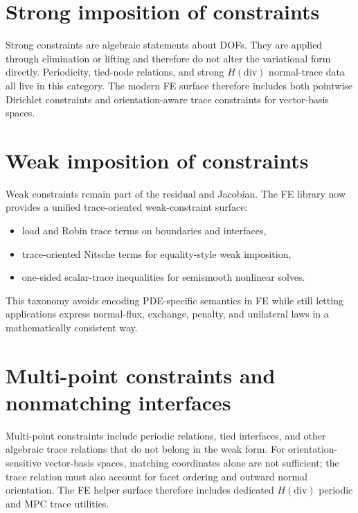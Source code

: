 \section{Strong imposition of constraints}
\label{sec:assembly:strong_constraints}

Strong constraints are algebraic statements about DOFs. They are applied
through elimination or lifting and therefore do not alter the variational form
directly. Periodicity, tied-node relations, and strong $H(\mathrm{div})$
normal-trace data all live in this category. The modern FE surface therefore
includes both pointwise Dirichlet constraints and orientation-aware trace
constraints for vector-basis spaces.

\section{Weak imposition of constraints}
\label{sec:assembly:weak_constraints}

Weak constraints remain part of the residual and Jacobian. The FE library now
provides a unified trace-oriented weak-constraint surface:

\begin{itemize}
\item load and Robin trace terms on boundaries and interfaces,
\item trace-oriented Nitsche terms for equality-style weak imposition,
\item one-sided scalar-trace inequalities for semismooth nonlinear solves.
\end{itemize}

This taxonomy avoids encoding PDE-specific semantics in FE while still letting
applications express normal-flux, exchange, penalty, and unilateral laws in a
mathematically consistent way.

\section{Multi-point constraints and nonmatching interfaces}
\label{sec:assembly:mpc}

Multi-point constraints include periodic relations, tied interfaces, and other
algebraic trace relations that do not belong in the weak form. For
orientation-sensitive vector-basis spaces, matching coordinates alone are not
sufficient; the trace relation must also account for facet ordering and outward
normal orientation. The FE helper surface therefore includes dedicated
$H(\mathrm{div})$ periodic and MPC trace utilities.

